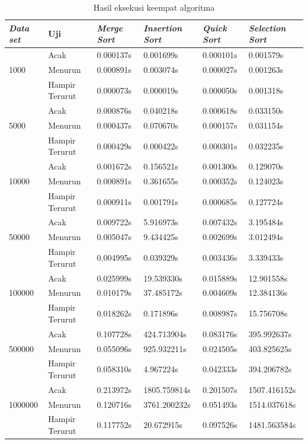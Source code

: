 \documentclass{article}
\begin{document}
	\begin{table}[h]
		\centering\small	
		\begin{tabular}{|l|l|l|l|l|l|}
			\hline
			\textit{Data set}& Uji& \textit{Merge Sort} & \textit{Insertion Sort} & \textit{Quick Sort} & \textit{Selection Sort} \\
			\hline
			& Acak & 0.000137s & 0.001699s & 0.000101s & 0.001579s \\
			1000 & Menurun & 0.000891s & 0.003074s & 0.000027s & 0.001263s \\
			& Hampir Terurut& 0.000073s & 0.000019s & 0.000050s & 0.001318s \\
			\hline
			& Acak & 0.000876s & 0.040218s & 0.000618s & 0.033150s \\
			5000 & Menurun & 0.000437s & 0.070670s & 0.000157s & 0.031154s \\
			& Hampir Terurut & 0.000429s & 0.000422s & 0.000301s & 0.032235s \\
			\hline
			& Acak & 0.001672s & 0.156521s & 0.001300s & 0.129070s \\
			10000 & Menurun & 0.000891s & 0.361655s & 0.000352s & 0.124023s \\
			& Hampir Terurut & 0.000911s & 0.001791s & 0.000685s & 0.127724s \\
			\hline
			& Acak & 0.009722s & 5.916973s & 0.007432s & 3.195484s \\
			50000 & Menurun & 0.005047s & 9.434425s & 0.002699s & 3.012494s \\
			& Hampir Terurut& 0.004995s & 0.039329s & 0.003436s & 3.339433s \\
			\hline
			& Acak & 0.025999s & 19.539330s & 0.015889s & 12.901558s \\
			100000 & Menurun & 0.010179s & 37.485172s & 0.004609s & 12.384136s \\
			& Hampir Terurut& 0.018262s & 0.171896s & 0.008987s & 15.756708s \\
			\hline
			& Acak & 0.107728s & 424.713904s & 0.083176s & 395.992637s \\
			500000 & Menurun & 0.055096s & 925.932211s & 0.024505s & 403.825625s \\
			& Hampir Terurut& 0.058310s & 4.967224s & 0.042333s & 394.206782s \\
			\hline
			& Acak & 0.213972s & 1805.759814s & 0.201507s & 1507.416152s \\
			1000000 & Menurun & 0.120716s & 3761.200232s & 0.051493s & 1514.037618s \\
			& Hampir Terurut& 0.117752s & 20.672915s & 0.097526s & 1481.563584s \\
			\hline
		\end{tabular}
		\caption{Hasil eksekusi keempat algoritma}
	\end{table}
	
\end{document}
